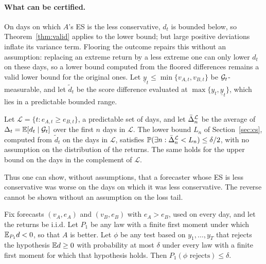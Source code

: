 \paragraph{What can be certified.}
On days on which $A$'s ES is the less conservative, $d_t$ is bounded below,
so Theorem~\ref{thm:valid} applies to the lower bound; but large positive
deviations inflate its variance term. Flooring the outcome repairs this
without an assumption: replacing an extreme return by a less extreme one
can only lower $d_t$ on these days, so a lower bound computed from the
floored differences remains a valid lower bound for the original ones. Let $\underline y_t\le\min\{v_{A,t},v_{B,t}\}$ be
$\mathcal{G}_t$-measurable, and let $\tilde d_t$ be the score difference evaluated at
$\max\{y_t,\underline y_t\}$, which lies in a predictable bounded range.

\begin{proposition}
\label{prop:es-one-sided}
Let $\mathcal L=\{t:e_{A,t}\ge e_{B,t}\}$, a predictable set of days, and
let $\bar\Delta^{\mathcal L}_n$ be the average of $\Delta_t=\mathbb{E}[d_t\mid\mathcal{G}_t]$ over
the first $n$ days in $\mathcal L$. The lower bound $L_n$ of
Section~\ref{sec:cs}, computed from $\tilde d_t$ on the days in $\mathcal L$,
satisfies $\mathbb{P}(\exists n:\bar\Delta^{\mathcal L}_n<L_n)\le\delta/2$, with no
assumption on the distribution of the returns. The same holds for the upper
bound on the days in the complement of $\mathcal L$.
\end{proposition}

Thus one can show, without assumptions, that a forecaster whose ES is less
conservative was worse on the days on which it was less conservative. The
reverse cannot be shown without an assumption on the loss tail.

\begin{proposition}
\label{prop:es-impossible}
Fix forecasts $(v_A,e_A)$ and $(v_B,e_B)$ with $e_A>e_B$, used on every
day, and let the returns be i.i.d. Let $P_1$ be any law with a finite first
moment under which $\mathbb{E}_{P_1}d<0$, so that $A$ is better. Let $\phi$ be any
test based on $y_1,\ldots,y_T$ that rejects the hypothesis
$\mathbb{E} d\ge0$ with probability at most $\delta$ under every law with a finite
first moment for which that hypothesis holds. Then
$P_1(\phi\text{ rejects})\le\delta$.
\end{proposition}

